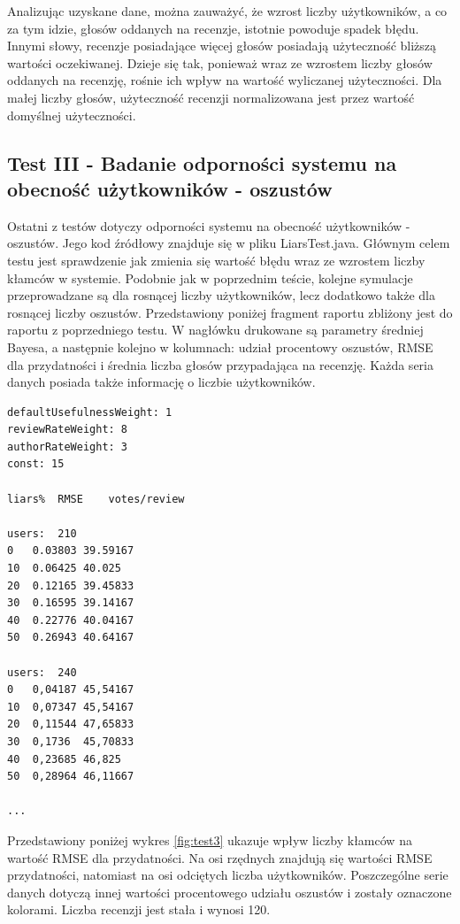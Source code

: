 Analizując uzyskane dane, można zauważyć, że wzrost liczby użytkowników, a co za tym idzie, głosów oddanych na recenzje, istotnie powoduje spadek błędu. Innymi słowy, recenzje posiadające więcej głosów posiadają użyteczność bliższą wartości oczekiwanej. Dzieje się tak, ponieważ wraz ze wzrostem liczby głosów oddanych na recenzję, rośnie ich wpływ na wartość wyliczanej użyteczności. Dla małej liczby głosów, użyteczność recenzji normalizowana jest przez wartość domyślnej użyteczności.

\subsection{Test III - Badanie odporności systemu na obecność użytkowników - oszustów}

Ostatni z testów dotyczy odporności systemu na obecność użytkowników - oszustów. Jego kod źródłowy znajduje się w pliku LiarsTest.java. Głównym celem testu jest sprawdzenie jak zmienia się wartość błędu wraz ze wzrostem liczby kłamców w systemie. Podobnie jak w poprzednim teście, kolejne symulacje przeprowadzane są dla rosnącej liczby użytkowników, lecz dodatkowo także dla rosnącej liczby oszustów. Przedstawiony poniżej fragment raportu zbliżony jest do raportu z poprzedniego testu. W nagłówku drukowane są parametry średniej Bayesa, a następnie kolejno w kolumnach: udział procentowy oszustów, RMSE dla przydatności i średnia liczba głosów przypadająca na recenzję. Każda seria danych posiada także informację o liczbie użytkowników.

\begin{lstlisting}
defaultUsefulnessWeight: 1
reviewRateWeight: 8
authorRateWeight: 3
const: 15

liars%	RMSE	votes/review

users:	210
0	0.03803	39.59167
10	0.06425	40.025
20	0.12165	39.45833
30	0.16595	39.14167
40	0.22776	40.04167
50	0.26943	40.64167

users:	240	
0	0,04187	45,54167
10	0,07347	45,54167
20	0,11544	47,65833
30	0,1736	45,70833
40	0,23685	46,825
50	0,28964	46,11667

...
\end{lstlisting}

Przedstawiony poniżej wykres \ref{fig:test3} ukazuje wpływ liczby kłamców na wartość RMSE dla przydatności. Na osi rzędnych znajdują się wartości RMSE przydatności, natomiast na osi odciętych liczba użytkowników. Poszczególne serie danych dotyczą innej wartości procentowego udziału oszustów i zostały oznaczone kolorami. Liczba recenzji jest stała i wynosi 120.

